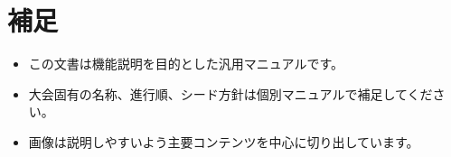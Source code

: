 \documentclass[11pt]{ltjsarticle}
\begin{document}
\section{補足}
\begin{itemize}
  \item この文書は機能説明を目的とした汎用マニュアルです。
  \item 大会固有の名称、進行順、シード方針は個別マニュアルで補足してください。
  \item 画像は説明しやすいよう主要コンテンツを中心に切り出しています。
\end{itemize}
\end{document}
